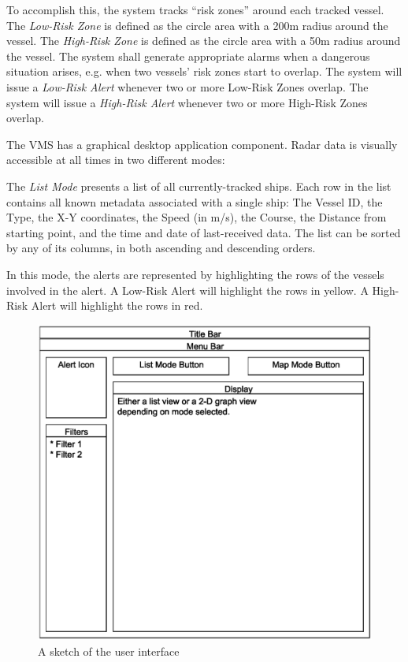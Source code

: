\documentclass{article}
\begin{document}
To accomplish this, the system tracks ``risk zones'' around each tracked vessel. The \emph{Low-Risk Zone} is defined as the circle area with a 200m radius around the vessel. The \emph{High-Risk Zone} is defined as the circle area with a 50m radius around the vessel. The system shall generate appropriate alarms when a dangerous situation arises, e.g. when two vessels' risk zones start to overlap. The system will issue a \emph{Low-Risk Alert} whenever two or more Low-Risk Zones overlap. The system will issue a \emph{High-Risk Alert} whenever two or more High-Risk Zones overlap.

The VMS has a graphical desktop application component. Radar data is visually accessible at all times in two different modes:

The \emph{List Mode} presents a list of all currently-tracked ships. Each row in the list contains all known metadata associated with a single ship: The Vessel ID, the Type, the X-Y coordinates, the Speed (in m/s), the Course, the Distance from starting point, and the time and date of last-received data. The list can be sorted by any of its columns, in both ascending and descending orders.

In this mode, the alerts are represented by highlighting the rows of the vessels involved in the alert. A Low-Risk Alert will highlight the rows in yellow. A High-Risk Alert will highlight the rows in red.

\begin{figure}[h]
\caption{A sketch of the user interface}
\includegraphics[width=\linewidth]{gui-proto.eps}
\end{figure}
\end{document}
